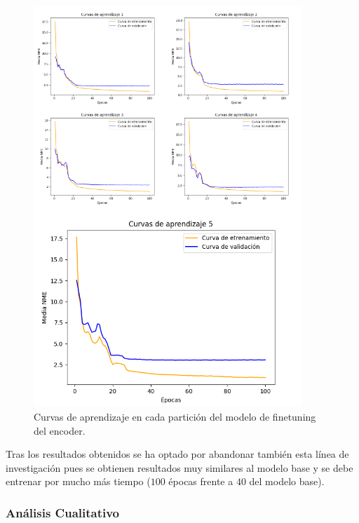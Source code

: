         \begin{figure}[H]
            \centering
            \includegraphics[width=0.9\textwidth]{img/curvas_decoder.png}
            \caption{Curvas de aprendizaje en cada partición del modelo de finetuning del encoder.}
            \label{fig:curvas_decoder}
        \end{figure}

        \medskip

        \noindent Tras los resultados obtenidos se ha optado por abandonar también esta línea de investigación pues se obtienen resultados muy similares al modelo base y se debe entrenar por mucho más tiempo ($100$ épocas frente a $40$ del modelo base). 
        
        \subsubsection*{Análisis Cualitativo}
        
